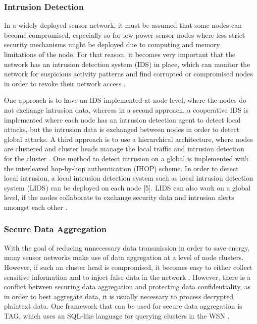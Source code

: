 \documentclass[12pt,a4paper,twoside]{report}
\begin{document}
\subsubsection{Intrusion Detection}
In a widely deployed sensor network, it must be assumed that some nodes can become compromised, especially so for low-power sensor nodes where less strict security mechanisms might be deployed due to computing and memory limitations of the node. For that reason, it becomes very important that the network has an intrusion detection system (IDS) in place, which can monitor the network for suspicious activity patterns and find corrupted or compromised nodes in order to revoke their network access \cite{sen:2009}.\par
One approach is to have an IDS implemented at node level, where the nodes do not exchange intrusion data, whereas in a second approach, a cooperative IDS is implemented where each node has an intrusion detection agent to detect local attacks, but the intrusion data is exchanged between nodes in order to detect global attacks. A third approach is to use a hierarchical architecture, where nodes are clustered and cluster heads manage the local traffic and intrusion detection for the cluster \cite{sen:2009}. One method to detect intrusion on a global is implemented with the interleaved hop-by-hop authentication (IHOP) scheme. In order to detect local intrusion, a local intrusion detection system such as local intrusion detection system (LIDS) can be deployed on each node [5]. LIDS can also work on a global level, if the nodes collaborate to exchange security data and intrusion alerts amongst each other \cite{sen:2009}.\par
\subsubsection{Secure Data Aggregation}
With the goal of reducing unnecessary data transmission in order to save energy, many sensor networks make use of data aggregation at a level of node clusters. However, if such an cluster head is compromised, it becomes easy to either collect sensitive information and to inject false data in the network \cite{sen:2009}. However, there is a conflict between securing data aggregation and protecting data confidentiality, as in order to best aggregate data, it is usually necessary to process decrypted plaintext data. One framework that can be used for secure data aggregation is TAG, which uses an SQL-like language for querying clusters in the WSN \cite{sen:2009}.\par
\end{document}
